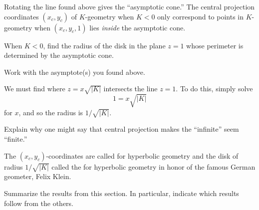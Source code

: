 \documentclass{ximera}
\begin{document}
Rotating the line found above gives the ``asymptotic cone.'' The
central projection coordinates $(x_{c},y_{c})$ of $K$-geometry when
$K<0$ only correspond to points in $K$-geometry when $(x_{c},y_{c},1)$
lies \textit{inside} the asymptotic cone.

\begin{problem}
  When $K<0$, find the radius of the disk in the plane $z=1$ whose
  perimeter is determined by the asymptotic cone. 
  \begin{hint}
    Work with the asymptote(s) you found above.
  \end{hint}
  \begin{freeResponse}
    We must find where $z = x\sqrt{|K|}$ intersects the line $z=1$. To do this, simply solve
    \[
    1 = x\sqrt{|K|}
    \]
    for $x$, and so the radius is $1/\sqrt{|K|}$.
  \end{freeResponse}
\end{problem}

\begin{problem}
  Explain why one might say that central projection makes the
  ``infinite'' seem ``finite.''
    \begin{freeResponse}
    \end{freeResponse}
\end{problem}

The $(x_{c},y_{c})$-coordinates are called  for
hyperbolic geometry and the disk of radius $1/\sqrt{|K|}$ called the
 for hyperbolic geometry in honor of the famous
German geometer, Felix Klein.

\begin{problem}
Summarize the results from this section. In particular, indicate which
results follow from the others.
\begin{freeResponse}
\end{freeResponse}
\end{problem}
\end{document}
